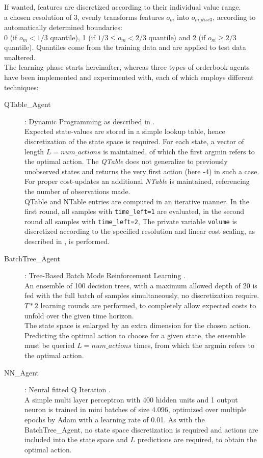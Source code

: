 If wanted, features are discretized according to their individual value range.\\
\Eg a chosen resolution of 3, evenly transforms features $o_m$ into $o_{m\_disc3}$, according to automatically determined boundaries: \\
0 (if $o_m< 1/3$ quantile), 1 (if $1/3 \leq o_m < 2/3$ quantile) and 2 (if $o_m \geq 2/3$ quantile). Quantiles come from the training data and are applied to test data unaltered.\\

The learning phase starts hereinafter, whereas three types of orderbook agents have been implemented and experimented with, each of which employs different techniques:

\begin{description}
\item[QTable\_Agent] : Dynamic Programming as described in .\\
Expected state-values are stored in a simple lookup table, hence discretization of the state space is required. For each state, a vector of length $L=num\_actions$ is maintained, of which the first argmin refers to the optimal action. The \emph{QTable} does not generalize to previously unobserved states and returns the very first action (here -4) in such a case. For proper cost-updates an additional \emph{NTable} is maintained, referencing the number of observations made.\\
QTable and NTable entries are computed in an iterative manner. In the first round, all samples with \lstinline!time_left=1! are evaluated, in the second round all samples with \lstinline!time_left=2!, \etc The private variable \lstinline!volume! is discretized according to the specified resolution and linear cost scaling, as described in , is performed.

\item[BatchTree\_Agent]: Tree-Based Batch Mode Reinforcement Learning \Cite{Ernst:2005:TreeBasedBatchModeRL}.\\
An ensemble of 100 decision trees, with a maximum allowed depth of 20 is fed with the full batch of samples simultaneously, no discretization require. $T*2$ learning rounds are performed, to completely allow expected costs to unfold over the given time horizon.\\
The state space is enlarged by an extra dimension for the chosen action. Predicting the optimal action to choose for a given state, the ensemble must be queried $L=num\_actions$ times, from which the argmin refers to the optimal action.

\item[NN\_Agent] : Neural fitted Q Iteration \Cite{Riedmiller:2005:NFQ}.\\
A simple multi layer perceptron with 400 hidden units and 1 output neuron is trained in mini batches of size 4.096, optimized over multiple epochs by Adam\Cite{Kingma:2014:Adam} with a learning rate of 0.01. As with the BatchTree\_Agent, no state space discretization is required and actions are included into the state space and $L$ predictions are required, to obtain the optimal action.
\end{description}
